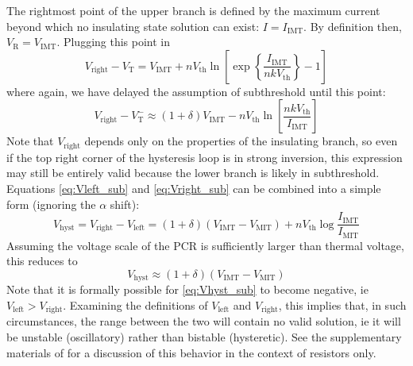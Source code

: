 \documentclass[letterpaper]{article}
\newcommand{\VT}{\ensuremath{V_\mathrm{T}}}
\newcommand{\VTm}{\ensuremath{V_\mathrm{T}^-}}
\newcommand{\Vth}{\ensuremath{V_\mathrm{th}}}
\newcommand{\IMIT}{\ensuremath{I_\mathrm{MIT}}}
\newcommand{\IIMT}{\ensuremath{I_\mathrm{IMT}}}
\begin{document}
The rightmost point of the upper branch is defined by the maximum current beyond which no insulating state solution can exist: $I=\IIMT $.  By definition then, $V_\mathrm{R}=V_\mathrm{IMT}$.  Plugging this point in
\begin{equation}
V_\mathrm{right}-\VT=V_\mathrm{IMT}+n\Vth \ln\left[\exp\left\{\frac{\IIMT }{nk\Vth }\right\}-1\right]
\end{equation}
where again, we have delayed the assumption of subthreshold until this point:
\begin{equation}
V_\mathrm{right}-\VTm\approx (1+\delta)V_\mathrm{IMT}-n\Vth \ln\left[\frac{nk\Vth }{\IIMT }\right]
\label{eq:Vright_sub}
\end{equation}
Note that $V_\mathrm{right}$ depends only on the properties of the insulating branch, so even if the top right corner of the hysteresis loop is in strong inversion, this expression may still be entirely valid because the lower branch is likely in subthreshold.
Equations \ref{eq:Vleft_sub} and \eqref{eq:Vright_sub} can be combined into a simple form (ignoring the $\alpha$ shift):
\begin{equation}
  V_\mathrm{hyst}=V_\mathrm{right}-V_\mathrm{left}=(1+\delta)(V_\mathrm{IMT}-V_\mathrm{MIT})+n\Vth \log\frac{\IIMT }{\IMIT }
  \label{eq:Vhyst_sub}
\end{equation}
Assuming the voltage scale of the PCR is sufficiently larger than thermal voltage, this reduces to
\begin{equation}
  V_\mathrm{hyst}\approx (1+\delta)(V_\mathrm{IMT}-V_\mathrm{MIT})
  \label{eq:Vhyst_simple}
\end{equation}
Note that it is formally possible for \eqref{eq:Vhyst_sub} to become negative, ie $V_\mathrm{left}>V_\mathrm{right}$. Examining the definitions of $V_\mathrm{left}$ and $V_\mathrm{right}$, this implies that, in such circumstances, the range between the two will contain no valid solution, ie it will be unstable (oscillatory) rather than bistable (hysteretic).  See the supplementary materials of \cite{Shukla_2015} for a discussion of this behavior in the context of resistors only.
\end{document}
